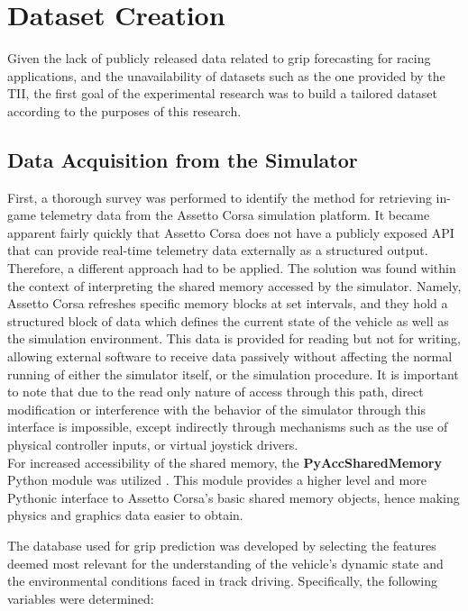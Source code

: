\documentclass[a4paper,final,12pt]{report}
\begin{document}
\section{Dataset Creation}
Given the lack of publicly released data related to grip forecasting for racing applications, and the unavailability of datasets such as the one provided by the TII, the first goal of the experimental research was to build a tailored dataset according to the purposes of this research.

\subsection{Data Acquisition from the Simulator}
First, a thorough survey was performed to identify the method for retrieving in-game telemetry data from the Assetto Corsa simulation platform. It became apparent fairly quickly that Assetto Corsa does not have a publicly exposed API that can provide real-time telemetry data externally as a structured output.\\

Therefore, a different approach had to be applied. The solution was found within the context of interpreting the shared memory accessed by the simulator. Namely, Assetto Corsa refreshes specific memory blocks at set intervals, and they hold a structured block of data which defines the current state of the vehicle as well as the simulation environment. This data is provided for reading but not for writing, allowing external software to receive data passively without affecting the normal running of either the simulator itself, or the simulation procedure. It is important to note that due to the read only nature of access through this path, direct modification or interference with the behavior of the simulator through this interface is impossible, except indirectly through mechanisms such as the use of physical controller inputs, or virtual joystick drivers.\\

For increased accessibility of the shared memory, the \textbf{PyAccSharedMemory} Python module was utilized \cite{pyaccsharedmemory2025}. This module provides a higher level and more Pythonic interface to Assetto Corsa's basic shared memory objects, hence making physics and graphics data easier to obtain. 

The database used for grip prediction was developed by selecting the features deemed most relevant for the understanding of the vehicle's dynamic state and the environmental conditions faced in track driving. Specifically, the following variables were determined:
\end{document}
